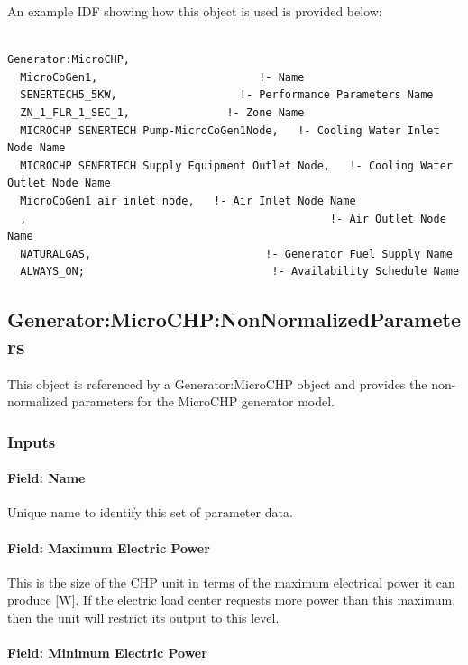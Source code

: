 An example IDF showing how this object is used is provided below:

\begin{lstlisting}

Generator:MicroCHP,
  MicroCoGen1,                         !- Name
  SENERTECH5_5KW,                   !- Performance Parameters Name
  ZN_1_FLR_1_SEC_1,               !- Zone Name
  MICROCHP SENERTECH Pump-MicroCoGen1Node,   !- Cooling Water Inlet Node Name
  MICROCHP SENERTECH Supply Equipment Outlet Node,   !- Cooling Water Outlet Node Name
  MicroCoGen1 air inlet node,   !- Air Inlet Node Name
  ,                                               !- Air Outlet Node Name
  NATURALGAS,                           !- Generator Fuel Supply Name
  ALWAYS_ON;                             !- Availability Schedule Name
\end{lstlisting}

\subsection{Generator:MicroCHP:NonNormalizedParameters}\label{generatormicrochpnonnormalizedparameters}

This object is referenced by a Generator:MicroCHP object and provides the non-normalized parameters for the MicroCHP generator model.

\subsubsection{Inputs}\label{inputs-11-003}

\paragraph{Field: Name}\label{field-name-12-002}

Unique name to identify this set of parameter data.

\paragraph{Field: Maximum Electric Power}\label{field-maximum-electric-power}

This is the size of the CHP unit in terms of the maximum electrical power it can produce {[}W{]}. If the electric load center requests more power than this maximum, then the unit will restrict its output to this level.

\paragraph{Field: Minimum Electric Power}\label{field-minimum-electric-power}

